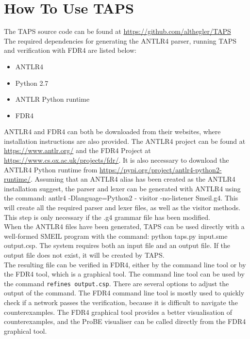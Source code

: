 \chapter{How To Use TAPS}
The TAPS source code can be found at \url{https://github.com/althegler/TAPS}\\

The required dependencies for generating the ANTLR4 parser, running TAPS and verification with FDR4 are listed below:
\begin{itemize}
    \item ANTLR4
    \item Python 2.7
    \item ANTLR Python runtime
    \item FDR4
\end{itemize}

ANTLR4 and FDR4 can both be downloaded from their websites, where installation instructions are also provided.
The ANTLR4 project can be found at \url{https://www.antlr.org/} and the FDR4 Project at \url{https://www.cs.ox.ac.uk/projects/fdr/}.
It is also necessary to download the ANTLR4 Python runtime from \url{https://pypi.org/project/antlr4-python2-runtime/}.
Assuming that an ANTLR4 alias has been created as the ANTLR4 installation suggest, the parser and lexer can be generated with ANTLR4 using the command: {\ttfamily antlr4 -Dlanguage=Python2 - visitor -no-listener Smeil.g4.}
This will create all the required parser and lexer files, as well as the visitor methods. This step is only necessary if the .g4 grammar file has been modified.\\

When the ANTLR4 files have been generated, TAPS can be used directly with a well-formed SMEIL program with the command: {\ttfamily python taps.py input.sme output.csp}. The system requires both an input file and an output file. If the output file does not exist, it will be created by TAPS. \\

The resulting \cspm{} file can be verified in FDR4, either by the command line tool or by the FDR4 tool, which is a graphical tool. The command line tool can be used by the command \texttt{refines output.csp}. There are several options to adjust the output of the command. The FDR4 command line tool is mostly used to quickly check if a network passes the verification, because it is difficult to navigate the counterexamples. The FDR4 graphical tool provides a better visualisation of counterexamples, and the ProBE visualiser can be called directly from the FDR4 graphical tool.

